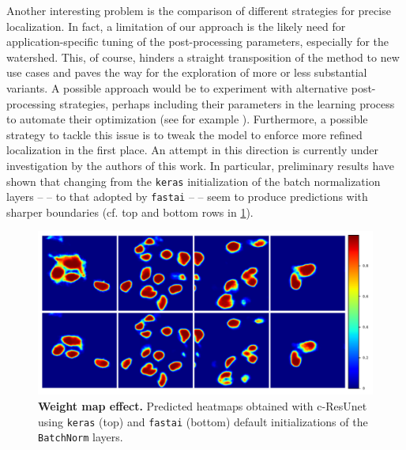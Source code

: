 Another interesting problem is the comparison of different strategies for precise localization. In fact, a limitation of our approach is the likely need for application-specific tuning of the post-processing parameters, especially for the watershed.
This, of course, hinders a straight transposition of the method to new use cases and paves the way for the exploration of more or less substantial variants.
A possible approach would be to experiment with alternative post-processing strategies, perhaps including their parameters in the learning process to automate their optimization (see for example ).
Furthermore, a possible strategy to tackle this issue is to tweak the model to enforce more refined localization in the first place.
An attempt in this direction is currently under investigation by the authors of this work.
In particular, preliminary results have shown that changing from the \texttt{keras} initialization of the batch normalization layers --  -- to that adopted by \texttt{fastai} \cite{2020fastai} --  -- seem to produce predictions with sharper boundaries (cf. top and bottom rows in \cref{fig:kerasVSfastai_bathnorm}).
\begin{figure}
\centering
\includegraphics[width=\textwidth]{figures/610_future_works/Tc-ResUnetVSBbatchnorm_effect.pdf}
\caption{\textbf{Weight map effect.} 
Predicted heatmaps obtained with c-ResUnet using \texttt{keras} (top) and \texttt{fastai} (bottom) default initializations of the \texttt{BatchNorm} layers.} 
\label{fig:kerasVSfastai_bathnorm}
\end{figure}

